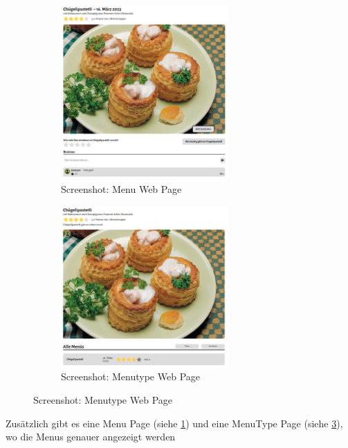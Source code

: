 \begin{figure}[htp]
    \begin{subfigure}[b]{0.5\textwidth}
        \centering
        \includegraphics[width=0.7\textwidth]{images/Res_Menu.png}
        \caption{Screenshot: Menu Web Page}
        \label{fig:r-menu}
    \end{subfigure}
    \begin{subfigure}[b]{0.5\textwidth}
        \centering
        \includegraphics[width=0.7\textwidth]{images/Res_Menutype.png}
        \caption{Screenshot: Menutype Web Page}
        \label{fig:r-menutype}
    \end{subfigure}
    \hfill
\end{figure}

Zusätzlich gibt es eine Menu Page (siehe \ref{fig:r-menu}) und eine MenuType
Page (siehe \ref{fig:r-menutype}), wo die Menus genauer angezeigt werden  


